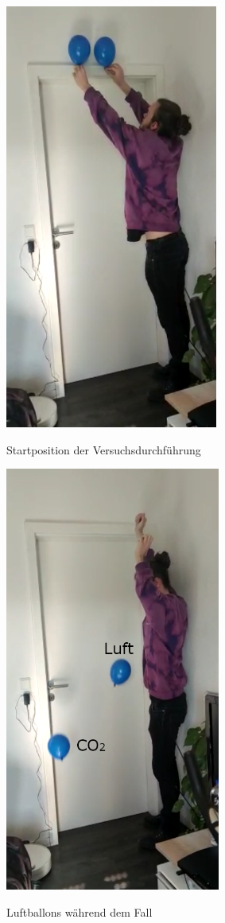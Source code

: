 \documentclass{article}
\begin{document}
      \begin{figure}[ht]
          \centering
          \begin{minipage}[t]{0.4\textwidth}\label{fig:Fall2}
              \includegraphics[height=14cm]{fallversuch2.png}
              \caption{Startposition der Versuchsdurchführung}
          \end{minipage}
          \hfill
          \begin{minipage}[t]{0.4\textwidth}\label{fig:Fall3}
              \includegraphics[height=14cm]{fallversuch3.png}
              \caption{Luftballons während dem Fall}
          \end{minipage}
      \end{figure}
\end{document}
